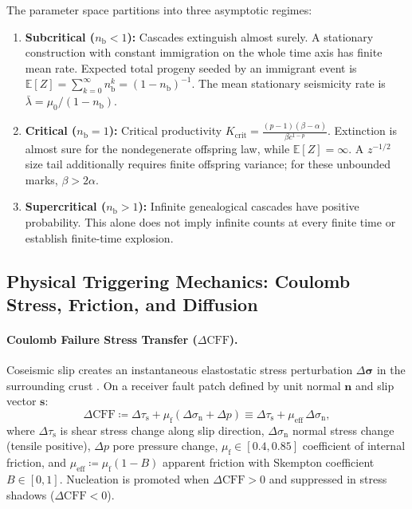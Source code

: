 \begin{corollary}
  \label{cor:clustering_criticality}
  The parameter space partitions into three asymptotic regimes:
  \begin{enumerate}[label=(\roman*),noitemsep]
    \item \textbf{Subcritical ($n_{\mathrm{b}} < 1$):} Cascades
      extinguish almost surely. A stationary construction with constant
      immigration on the whole time axis has finite mean rate.
      Expected total progeny seeded by an immigrant event
      is $\mathbb{E}[Z] = \sum_{k=0}^\infty n_{\mathrm{b}}^k = (1 -
      n_{\mathrm{b}})^{-1}$. The mean stationary seismicity rate is
      $\bar{\lambda} = \mu_0 / (1 - n_{\mathrm{b}})$.
    \item \textbf{Critical ($n_{\mathrm{b}} = 1$):} Critical
      productivity $K_{\mathrm{crit}} = \frac{(p - 1)(\beta -
      \alpha)}{\beta c^{1-p}}$. Extinction is almost sure for the
      nondegenerate offspring law, while $\mathbb E[Z]=\infty$.
      A $z^{-1/2}$ size tail additionally requires finite offspring
      variance; for these unbounded marks, $\beta>2\alpha$.
    \item \textbf{Supercritical ($n_{\mathrm{b}}>1$):} Infinite
      genealogical cascades have positive probability. This alone
      does not imply infinite counts at every finite time or
      establish finite-time explosion.
  \end{enumerate}
\end{corollary}

\subsection{Physical Triggering Mechanics: Coulomb Stress, Friction,
and Diffusion}
\label{subsec:clustering_physical_mechanisms}

\paragraph{Coulomb Failure Stress Transfer ($\Delta\mathrm{CFF}$).}
Coseismic slip creates an instantaneous elastostatic stress
perturbation $\Delta\bm{\sigma}$ in the surrounding crust
\parencite{okada1992,king1994,stein1999,harris1998}. On a receiver
fault patch defined by
unit normal $\mathbf{n}$ and slip vector $\mathbf{s}$:
\begin{equation}
  \Delta\mathrm{CFF} \coloneqq \Delta\tau_{\mathrm{s}} + \mu_{\mathrm{f}}
  (\Delta\sigma_{\mathrm{n}} + \Delta p) \equiv \Delta\tau_{\mathrm{s}} +
  \mu_{\mathrm{eff}} \, \Delta\sigma_{\mathrm{n}},
  \label{eq:clustering_coulomb_cff}
\end{equation}
where $\Delta\tau_{\mathrm{s}}$ is shear stress change along slip
direction, $\Delta\sigma_{\mathrm{n}}$ normal stress change (tensile
positive), $\Delta p$ pore pressure change, $\mu_{\mathrm{f}} \in
[\num{0.4}, \num{0.85}]$ coefficient of internal friction, and
$\mu_{\mathrm{eff}} \coloneqq \mu_{\mathrm{f}}(1 - B)$ apparent friction
with Skempton coefficient $B \in [\num{0}, \num{1}]$. Nucleation is promoted
when $\Delta\mathrm{CFF} > 0$ and suppressed in stress shadows
($\Delta\mathrm{CFF} < 0$).

